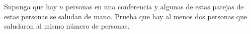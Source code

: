 \begin{problem}
    Suponga que hay $n$ personas en una conferencia y algunas de estas
    parejas de estas personas se saludan de mano.
    Prueba que hay al menos dos personas que saludaron
    al mismo n\'umero de personas. 

    \label{112CP153}
\end{problem}